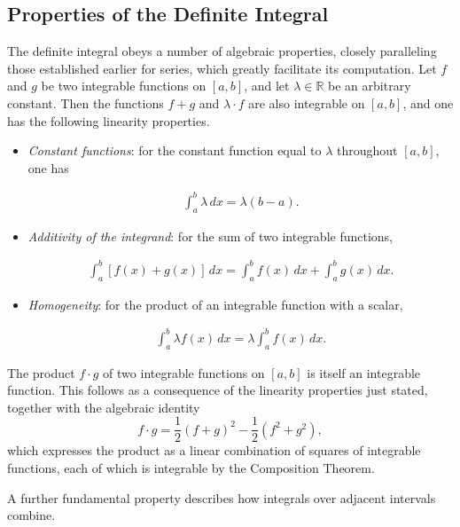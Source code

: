\subsection{Properties of the Definite Integral}

The definite integral obeys a number of algebraic properties, closely paralleling those established earlier for series, which greatly facilitate its computation. Let $f$ and $g$ be two integrable functions on $[a,b]$, and let $\lambda \in \mathbb{R}$ be an arbitrary constant. Then the functions $f + g$ and $\lambda \cdot f$ are also integrable on $[a,b]$, and one has the following linearity properties.
\begin{itemize}
\item \textit{Constant functions}: for the constant function equal to $\lambda$ throughout $[a,b]$, one has

\begin{align*}
\int_a^b \lambda \, dx = \lambda (b-a).
\end{align*}

\item \textit{Additivity of the integrand}: for the sum of two integrable functions,

\begin{align*}
\int_a^b [f(x) + g(x)] \, dx = \int_a^b f(x) \, dx + \int_a^b g(x) \, dx.
\end{align*}

\item \textit{Homogeneity}: for the product of an integrable function with a scalar,

\begin{align*}
\int_a^b \lambda f(x) \, dx = \lambda \int_a^b f(x) \, dx.
\end{align*}

\end{itemize}

\begin{remark}
The product $f \cdot g$ of two integrable functions on $[a,b]$ is itself an integrable function. This follows as a consequence of the linearity properties just stated, together with the algebraic identity
\[
f \cdot g = \frac{1}{2}(f+g)^2 - \frac{1}{2}(f^2 + g^2),
\]
which expresses the product as a linear combination of squares of integrable functions, each of which is integrable by the Composition Theorem.
\end{remark}

A further fundamental property describes how integrals over adjacent intervals combine.

